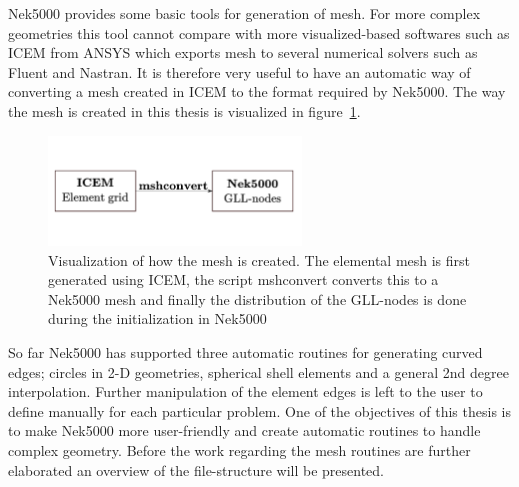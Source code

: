
Nek5000 provides some basic tools for generation of mesh. For more complex geometries this tool cannot compare with more visualized-based softwares 
such as ICEM from ANSYS which exports mesh to several numerical solvers such as Fluent and Nastran.
It is therefore very useful to have an automatic way of converting a mesh created in ICEM to the format required by Nek5000. 
The way the mesh is created in this thesis is visualized in figure~\ref{fig:mesh}.
%
\begin{figure}[h]
	\centering
	\includegraphics[width=0.6\textwidth]{Figures/mesh.pdf}
	\caption{Visualization of how the mesh is created. The elemental mesh is first generated using ICEM, the script mshconvert
    converts this to a Nek5000 mesh and finally the distribution of the GLL-nodes is done during the initialization in Nek5000}
	\label{fig:mesh}
\end{figure}
%

So far Nek5000 has supported three automatic routines for generating curved edges;
circles in 2-D geometries, spherical shell elements and a general 2nd degree interpolation.
Further manipulation of the element edges is left to the user to define manually
for each particular problem. One of the objectives of this thesis is to make Nek5000 more
user-friendly and create automatic routines to handle complex geometry. Before the work regarding
the mesh routines are further elaborated an overview of the file-structure will be presented.

